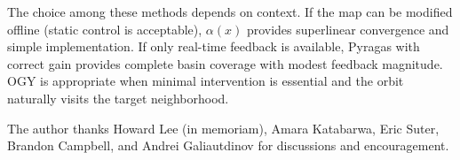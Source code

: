 \documentclass[aps,pre,twocolumn,superscriptaddress,nofootinbib,
               longbibliography,floatfix]{revtex4-2}
\begin{document}
The choice among these methods depends on context.
If the map can be modified offline (static control is
acceptable), $\alpha(x)$ provides superlinear convergence and
simple implementation.
If only real-time feedback is available, Pyragas with correct
gain provides complete basin coverage with modest feedback
magnitude.
OGY is appropriate when minimal intervention is essential
and the orbit naturally visits the target neighborhood.

\begin{acknowledgments}
The author thanks Howard Lee (in memoriam), Amara Katabarwa,
Eric Suter, Brandon Campbell, and Andrei Galiautdinov for
discussions and encouragement.
\end{acknowledgments}


\end{document}
